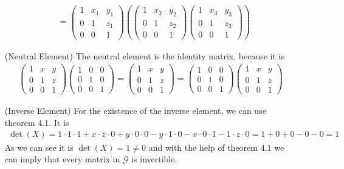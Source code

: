 \documentclass[solution]{tudexercise}
\begin{document}
\begin{itemize}
\begin{align*}
&= \begin{pmatrix}
1 & x_1 & y_1\\
0 & 1 & z_1\\
0 & 0 & 1
\end{pmatrix}\left(\begin{pmatrix}
1 & x_2 & y_2\\
0 & 1 & z_2\\
0 & 0 & 1
\end{pmatrix}\begin{pmatrix}
1 & x_3 & y_3\\
0 & 1 & z_3\\
0 & 0 & 1
\end{pmatrix}\right)
					\end{align*}
				
				\item[(Neutral Element)]
					The neutral element is the identity matrix, because it is
					\begin{align*}
\begin{pmatrix}
1 & x & y\\
0 & 1 & z\\
0 & 0 & 1
\end{pmatrix}\begin{pmatrix}
1 & 0 & 0\\
0 & 1 & 0\\
0 & 0 & 1
\end{pmatrix} = \begin{pmatrix}
1 & x & y\\
0 & 1 & z\\
0 & 0 & 1
\end{pmatrix} = \begin{pmatrix}
1 & 0 & 0\\
0 & 1 & 0\\
0 & 0 & 1
\end{pmatrix}\begin{pmatrix}
1 & x & y\\
0 & 1 & z\\
0 & 0 & 1
\end{pmatrix}
					\end{align*}
				
				\item[(Inverse Element)]
					For the existence of the inverse element, we can use theorem 4.1. It is
					\begin{align*}
\det(X) = 1 \cdot 1 \cdot 1 + x \cdot z \cdot 0 + y \cdot 0 \cdot 0 - y \cdot 1 \cdot 0 - x \cdot 0 \cdot 1 - 1 \cdot z \cdot 0 = 1 + 0 + 0 - 0 - 0 = 1
					\end{align*}
					As we can see it is $\det(X) = 1 \neq 0$ and with the help of theorem 4.1 we can imply that every matrix in $\mathcal{G}$ is invertible.
				\end{itemize}
\end{document}
